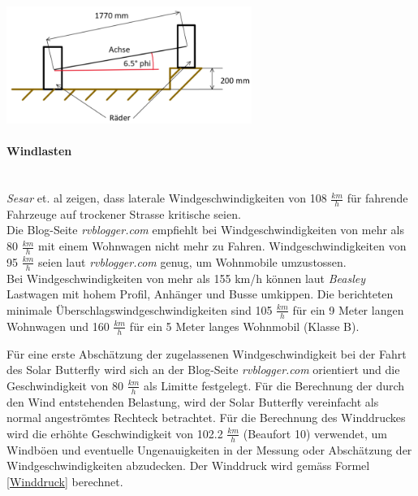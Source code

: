 \begin{description}
    \begin{center}
      \includegraphics[width=0.6\textwidth]{04_Figures/1.5 Skizze.png}
      \label{1.5 Skizze}
    \end{center}

  \end{description}

  \paragraph{Windlasten}\mbox{}\\
  \emph{Sesar} et. al \cite{Wind.1} zeigen, dass laterale Windgeschwindigkeiten von 108 $\frac{km}{h}$ für fahrende Fahrzeuge auf trockener Strasse kritische seien.\\
  Die Blog-Seite \emph{rvblogger.com} \cite{Wind.2} empfiehlt bei Windgeschwindigkeiten von mehr als 80 $\frac{km}{h}$ mit einem Wohnwagen nicht mehr zu Fahren. Windgeschwindigkeiten von 95 $\frac{km}{h}$ seien laut \emph{rvblogger.com} genug, um Wohnmobile umzustossen.\\
  Bei Windgeschwindigkeiten von mehr als 155 km/h können laut \emph{Beasley} \cite{Wind.3} Lastwagen mit hohem Profil, Anhänger und Busse umkippen. Die berichteten minimale Überschlagswindgeschwindigkeiten sind 105 $\frac{km}{h}$ für ein 9 Meter langen Wohnwagen und 160 $\frac{km}{h}$ für ein 5 Meter langes Wohnmobil (Klasse B).

  Für eine erste Abschätzung der zugelassenen Windgeschwindigkeit bei der Fahrt des Solar Butterfly wird sich an der Blog-Seite \emph{rvblogger.com} orientiert und die Geschwindigkeit von 80 $\frac{km}{h}$ als Limitte festgelegt. Für die Berechnung der durch den Wind entstehenden Belastung, wird der Solar Butterfly vereinfacht als normal angeströmtes Rechteck betrachtet. Für die Berechnung des Winddruckes wird die erhöhte Geschwindigkeit von 102.2 $\frac{km}{h}$ (Beaufort 10) verwendet, um Windböen und eventuelle Ungenauigkeiten in der Messung oder Abschätzung der Windgeschwindigkeiten abzudecken. Der Winddruck wird gemäss Formel \ref{Winddruck} berechnet.

